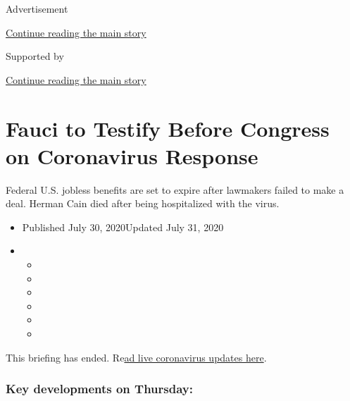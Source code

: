 Advertisement

\protect\hyperlink{after-top}{Continue reading the main story}

Supported by

\protect\hyperlink{after-sponsor}{Continue reading the main story}

\hypertarget{fauci-to-testify-before-congress-on-coronavirus-response}{%
\section{Fauci to Testify Before Congress on Coronavirus
Response}\label{fauci-to-testify-before-congress-on-coronavirus-response}}

Federal U.S. jobless benefits are set to expire after lawmakers failed
to make a deal. Herman Cain died after being hospitalized with the
virus.

\begin{itemize}
\item
  Published July 30, 2020Updated July 31, 2020
\item
  \begin{itemize}
  \item
  \item
  \item
  \item
  \item
  \item
  \end{itemize}
\end{itemize}

This briefing has ended.
Re\href{https://www.nytimes.com/2020/07/31/world/coronavirus-covid-19.html}{ad
live coronavirus updates here}.

\hypertarget{key-developments-on-thursday}{%
\subsubsection{Key developments on
Thursday:}\label{key-developments-on-thursday}}

